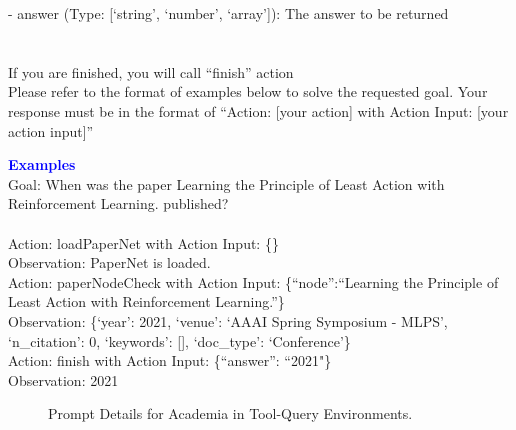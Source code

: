 \begin{tcolorbox}[breakable,title=Prompt Details for Academia]
- answer (Type: [`string', `number', `array']): The answer to be returned\\
\\
\\
If you are finished, you will call ``finish'' action\\
Please refer to the format of examples below to solve the requested goal. Your response must be in the format of ``Action: [your action] with Action Input: [your action input]''\\
\textbf{\textcolor{blue}{Examples}}\\
Goal: When was the paper Learning the Principle of Least Action with Reinforcement Learning. published?\\
\\
Action: loadPaperNet with Action Input: \{\}
\\
Observation: PaperNet is loaded.\\
Action: paperNodeCheck with Action Input: \{``node'':``Learning the Principle of Least Action with Reinforcement Learning.''\}\\
Observation: \{`year': 2021, `venue': `AAAI Spring Symposium - MLPS', `n\_citation': 0, `keywords': [], `doc\_type': `Conference'\}\\
Action: finish with Action Input: \{``answer'': ``2021"\}\\
Observation: 2021
\end{tcolorbox}
\begin{figure}[!h]
    \vspace{-0.08cm}
    \caption{Prompt Details for Academia in Tool-Query Environments.}
    \label{fig:academia_prompt}
\end{figure}